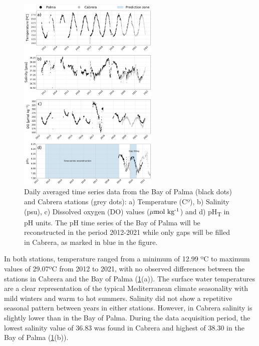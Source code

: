\begin{figure}[H]
    \centering
    \includegraphics[width=0.6\textwidth]{Figures/Data_study.pdf}
    \caption[Daily averaged time series data from the Bay of Palma and Cabrera
        stations]{Daily averaged time series data from the Bay of Palma (black
        dots)
        and Cabrera stations (grey dots): a) Temperature (Cº), b) Salinity
        (psu), c)
        Dissolved oxygen (DO) values (${\mu\textrm{mol
                        kg}\textsuperscript{-1}}$) and
        d) pH\textsubscript{T} in pH units. The pH time series of the Bay of
        Palma will
        be reconstructed in the period 2012-2021 while only gaps will be filled
        in
        Cabrera, as marked in blue in the figure.}
    \label{fig:data}
\end{figure}

In both stations, temperature ranged from a minimum of 12.99 ºC to maximum
values of 29.07ºC from 2012 to 2021, with no observed differences between the
stations in Cabrera and the Bay of Palma (\cref{fig:data}(a)). The surface
water temperatures are a clear representation of the typical Mediterranean
climate seasonality with mild winters and warm to hot summers. Salinity did not
show a repetitive seasonal pattern between years in either stations. However,
in Cabrera salinity is slightly lower than in the Bay of Palma. During the data
acquisition period, the lowest salinity value of 36.83 was found in Cabrera and
highest of 38.30 in the Bay of Palma (\cref{fig:data}(b)).

